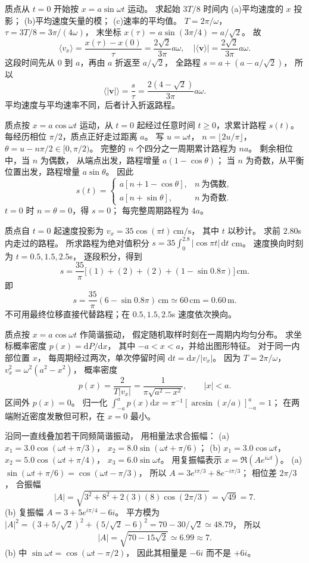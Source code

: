 质点从 $t=0$ 开始按
$x=a\sin\omega t$ 运动。
求起始 $3T/8$ 时间内
(a)平均速度的 $x$ 投影；
(b)平均速度矢量的模；
(c)速率的平均值。
\exsolution
$T=2\pi/\omega$，
$\tau=3T/8=3\pi/(4\omega)$，
末坐标
$x(\tau)=a\sin(3\pi/4)=a/\sqrt2$。
故
\[
\boxed{\langle v_x\rangle=
\frac{x(\tau)-x(0)}{\tau}
=\frac{2\sqrt2}{3\pi}a\omega},
\quad
\boxed{|\langle\bm v\rangle|=
\frac{2\sqrt2}{3\pi}a\omega}.
\]
这段时间先从 $0$ 到 $a$，再由 $a$ 折返至 $a/\sqrt2$，
全路程 $s=a+(a-a/\sqrt2)$，
所以
\[
\boxed{\langle|\bm v|\rangle=
\frac{s}{\tau}=
\frac{2(4-\sqrt2)}{3\pi}a\omega}.
\]
\excheck 平均速度与平均速率不同，后者计入折返路程。

质点按 $x=a\cos\omega t$ 运动，从 $t=0$ 起经过任意时间 $t\ge0$，求累计路程 $s(t)$。
\exsolution
每经历相位 $\pi/2$，质点正好走过距离 $a$。
写 $u=\omega t$，
$n=\lfloor2u/\pi\rfloor$，
$\theta=u-n\pi/2\in[0,\pi/2)$。
完整的 $n$ 个四分之一周期累计路程为 $na$。
剩余相位中，当 $n$ 为偶数，
从端点出发，路程增量 $a(1-\cos\theta)$；
当 $n$ 为奇数，从平衡位置出发，路程增量 $a\sin\theta$。
因此
\[
\boxed{s(t)=
\begin{cases}
a[n+1-\cos\theta],&n\ \text{为偶数},\\
a[n+\sin\theta],&n\ \text{为奇数}.
\end{cases}}
\]
\excheck $t=0$ 时 $n=\theta=0$，得 $s=0$；
每完整周期路程为 $4a$。

质点自 $t=0$ 起速度投影为
$v_x=35\cos(\pi t)\,\mathrm{cm/s}$，
其中 $t$ 以秒计。
求前 $2.80$s 内走过的路程。
\exsolution
所求路程为绝对值积分
$s=35\int_0^{2.8}|\cos\pi t|\,\mathrm dt$ cm。
速度换向时刻为 $t=0.5,1.5,2.5$s，
逐段积分，得到
\[
s=\frac{35}{\pi}
\bigl[(1)+(2)+(2)+(1-\sin0.8\pi)\bigr]
\,\mathrm{cm}.
\]
即
\[
\boxed{s=\frac{35}{\pi}(6-\sin0.8\pi)
\,\mathrm{cm}\simeq60\,\mathrm{cm}=0.60\,\mathrm m}.
\]
\excheck 不可用最终位移直接代替路程；在 $0.5,1.5,2.5$s 速度依次换向。

质点按 $x=a\cos\omega t$ 作简谐振动，
假定随机取样时刻在一周期内均匀分布。
求坐标概率密度 $p(x)=\mathrm dP/\mathrm dx$，
其中 $-a<x<a$，并给出图形特征。
\exsolution
对于同一内部位置 $x$，
每周期经过两次，单次停留时间
$\mathrm dt=\mathrm dx/|v_x|$。
因为 $T=2\pi/\omega$，
$v_x^2=\omega^2(a^2-x^2)$，
概率密度
\[
p(x)=\frac{2}{T|v_x|}
=\boxed{\frac1{\pi\sqrt{a^2-x^2}}},\qquad |x|<a.
\]
区间外 $p(x)=0$。
\excheck 归一化
$\int_{-a}^ap(x)\mathrm dx
=\pi^{-1}[\arcsin(x/a)]_{-a}^{a}=1$；
在两端附近密度发散但可积，在 $x=0$ 最小。

沿同一直线叠加若干同频简谐振动，
用相量法求合振幅：
(a) $x_1=3.0\cos(\omega t+\pi/3)$，
$x_2=8.0\sin(\omega t+\pi/6)$；
(b) $x_1=3.0\cos\omega t$，
$x_2=5.0\cos(\omega t+\pi/4)$，
$x_3=6.0\sin\omega t$。
\exsolution
用复振幅表示 $x=\Re(Ae^{i\omega t})$。
(a) $\sin(\omega t+\pi/6)=\cos(\omega t-\pi/3)$，
所以
$A=3e^{i\pi/3}+8e^{-i\pi/3}$；
相位差 $2\pi/3$，
合振幅
\[
\boxed{|A|=\sqrt{3^2+8^2+2(3)(8)\cos(2\pi/3)}
=\sqrt{49}=7}.
\]
(b) 复振幅
$A=3+5e^{i\pi/4}-6i$。
平方模为
$|A|^2=(3+5/\sqrt2)^2+(5/\sqrt2-6)^2
=70-30/\sqrt2\simeq48.79$，
所以
\[
\boxed{|A|=\sqrt{70-15\sqrt2}\simeq6.99\approx7}.
\]
\excheck (b) 中
$\sin\omega t=\cos(\omega t-\pi/2)$，
因此其相量是 $-6i$ 而不是 $+6i$。

